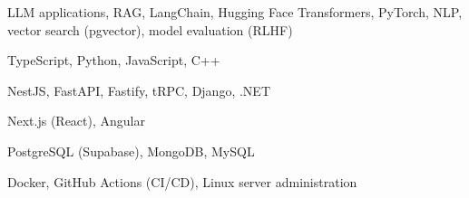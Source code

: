 \begin{description}[style=unboxed, leftmargin=1.2em, itemsep=0.2ex]
    \item[AI/ML:] LLM applications, RAG, LangChain, Hugging Face Transformers, PyTorch, NLP, vector search (pgvector), model evaluation (RLHF)
    \item[Languages:] TypeScript, Python, JavaScript, C++
    \item[Backend:] NestJS, FastAPI, Fastify, tRPC, Django, .NET
    \item[Frontend:] Next.js (React), Angular
    \item[Databases:] PostgreSQL (Supabase), MongoDB, MySQL
    \item[DevOps:] Docker, GitHub Actions (CI/CD), Linux server administration
\end{description}
